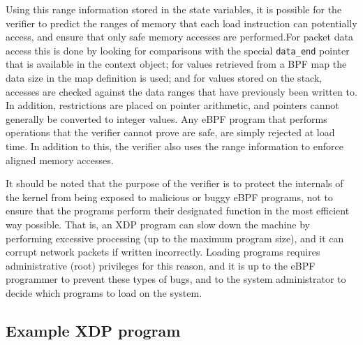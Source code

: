 \documentclass[sigconf]{acmart}
\begin{document}
Using this range information stored in the state variables, it is possible for
the verifier to predict the ranges of memory that each load instruction can
potentially access, and ensure that only safe memory accesses are performed.For
packet data access this is done by looking for comparisons with the special
\texttt{data\_end} pointer that is available in the context object; for values
retrieved from a BPF map the data size in the map definition is used; and for
values stored on the stack, accesses are checked against the data ranges that
have previously been written to. In addition, restrictions are placed on pointer
arithmetic, and pointers cannot generally be converted to integer values. Any
eBPF program that performs operations that the verifier cannot prove are safe,
are simply rejected at load time. In addition to this, the verifier also uses
the range information to enforce aligned memory accesses.

It should be noted that the purpose of the verifier is to protect the internals
of the kernel from being exposed to malicious or buggy eBPF programs, not to
ensure that the programs perform their designated function in the most efficient
way possible. That is, an XDP program can slow down the machine by performing
excessive processing (up to the maximum program size), and it can corrupt
network packets if written incorrectly. Loading programs requires administrative
(root) privileges for this reason, and it is up to the eBPF programmer to
prevent these types of bugs, and to the system administrator to decide which
programs to load on the system.


\subsection{Example XDP program}
\label{sec:example-xdp-program}
\end{document}
